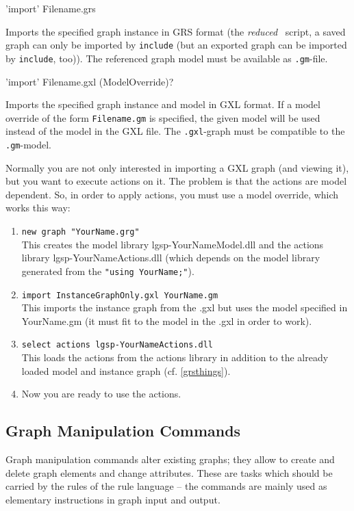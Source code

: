 \begin{rail}
  'import' Filename.grs
\end{rail}
Imports the specified graph instance in GRS format (the \emph{reduced} \GrShell\ script, a saved graph can only be imported by \texttt{include} (but an exported graph can be imported by \texttt{include}, too)).
The referenced graph model must be available as \texttt{.gm}-file.

\begin{rail}
  'import' Filename.gxl (ModelOverride)?
\end{rail}
Imports the specified graph instance and model in GXL format.
If a model override of the form \texttt{Filename.gm} is specified, the given model will be used instead of the model in the GXL file.
The \texttt{.gxl}-graph must be compatible to the \texttt{.gm}-model.

\begin{note}\label{shellgxlimport}
Normally you are not only interested in importing a GXL graph (and viewing it), but you want to execute actions on it.
The problem is that the actions are model dependent.
So, in order to apply actions, you must use a model override, which works this way:
\begin{enumerate}
\item \texttt{new graph "YourName.grg"}\\
This creates the model library lgsp-YourNameModel.dll
and the actions library lgsp-YourNameActions.dll
(which depends on the model library generated from the \texttt{"using YourName;"}).
\item \texttt{import InstanceGraphOnly.gxl YourName.gm}\\
This imports the instance graph from the .gxl but uses the model specified
in YourName.gm (it must fit to the model in the .gxl in order to work).
\item \texttt{select actions lgsp-YourNameActions.dll}\\
This loads the actions from the actions library in addition to the already
loaded model and instance graph (cf. \ref{grsthings}).
\item Now you are ready to use the actions.
\end{enumerate}
\end{note}


\subsection{Graph Manipulation Commands}
\label{mani}
Graph manipulation commands alter existing graphs; they allow to create and delete graph elements and change attributes. 
These are tasks which should be carried by the rules of the rule language -- the commands are mainly used as elementary instructions in graph input and output.

